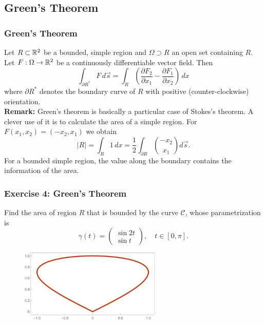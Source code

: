 \documentclass[11pt, t]{beamer}
\newcommand{\Remark}{\textbf{Remark: }}
\begin{document}
\subsection{Green's Theorem}
\begin{frame}
    \frametitle{Green's Theorem}
    Let $R\subset\mathbb{R}^2$ be a bounded, simple region and $\Omega\supset R$ an open set containing $R$. Let $F:\Omega\to\mathbb{R}^2$ be a continuously dif{}ferentiable vector field. Then
    \setcounter{equation}{0}
    \begin{equation*}\label{3.4.1}
        \int_{\partial R^*}F\,d\vec{s}=\int_R\left(\frac{\partial F_2}{\partial x_1}-\frac{\partial F_1}{\partial x_2}\right)\,dx
    \end{equation*}
    where $\partial R^*$ denotes the boundary curve of $R$ with positive
    (counter-clockwise) orientation.\\[9pt]

    \Remark Green's theorem is basically a particular case of Stokes's theorem. A clever use of it is to calculate the area of a simple region. For $F(x_1,x_2)=(-x_2,x_1)$ we obtain
    \[|R|=\int_R1\,dx=\frac{1}{2}\int_{\partial R}\binom{-x_2}{x_1}d\vec{s}.\]
    For a bounded simple region, the value along the boundary contains the information of the area.
\end{frame}

\begin{frame}
    \frametitle{Exercise 4: Green's Theorem}
    Find the area of region $R$ that is bounded by the curve $\mathcal{C}$, whose parametrization is %
    $$\gamma(t)=\begin{pmatrix}
            \sin 2t \\\sin t
        \end{pmatrix},\quad t\in[0,\pi].$$
    \begin{figure}[H]
        \centering
        \includegraphics[width=0.6\textwidth]{p1.pdf}
    \end{figure}



\end{frame}
\end{document}
